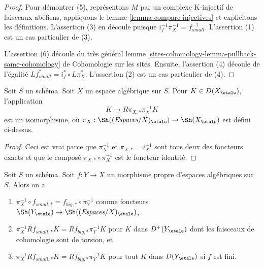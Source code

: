 \begin{proof}
Pour démontrer (5), représentons $M$ par un complexe K-injectif de faisceaux
abéliens, appliquons le lemme \ref{lemma-compare-injectives} et explicitons
les définitions. L'assertion (3) en découle puisque
$i_f^{-1}\pi_X^{-1} = f_{small}^{-1}$. L'assertion (1) est un cas
particulier de (3).

\medskip\noindent
L'assertion (6) découle du très général lemme
\ref{sites-cohomology-lemma-pullback-same-cohomology} de Cohomologie sur les
sites. Ensuite, l'assertion (4) découle de l'égalité
$Lf_{small}^* = i_f^* \circ L\pi_X^*$. L'assertion (2) est un cas particulier
de (4).
\end{proof}

\begin{lemma}
\label{lemma-cohomological-descent-etale}
Soit $S$ un schéma. Soit $X$ un espace algébrique sur $S$.
Pour $K \in D(X_\etale)$, l'application
$$
K \longrightarrow R\pi_{X, *}\pi_X^{-1}K
$$
est un isomorphisme, où
$\pi_X : \Sh((\textit{Espaces}/X)_\etale) \to \Sh(X_\etale)$ est défini ci-dessus.
\end{lemma}

\begin{proof}
Ceci est vrai parce que $\pi_X^{-1}$ et $\pi_{X, *} = i_X^{-1}$ sont tous deux
des foncteurs exacts et que le composé $\pi_{X, *} \circ \pi_X^{-1}$
est le foncteur identité.
\end{proof}

\begin{lemma}
\label{lemma-compare-higher-direct-image-proper}
Soit $S$ un schéma.
Soit $f : Y \to X$ un morphisme propre d'espaces algébriques sur $S$.
Alors on a
\begin{enumerate}
\item $\pi_X^{-1} \circ f_{small, *} = f_{big, *} \circ \pi_Y^{-1}$
comme foncteurs $\Sh(Y_\etale) \to \Sh((\textit{Espaces}/X)_\etale)$,
\item $\pi_X^{-1}Rf_{small, *}K = Rf_{big, *}\pi_Y^{-1}K$
pour $K$ dans $D^+(Y_\etale)$ dont les faisceaux de cohomologie sont de torsion, et
\item $\pi_X^{-1}Rf_{small, *}K = Rf_{big, *}\pi_Y^{-1}K$
pour tout $K$ dans $D(Y_\etale)$ si $f$ est fini.
\end{enumerate}
\end{lemma}

